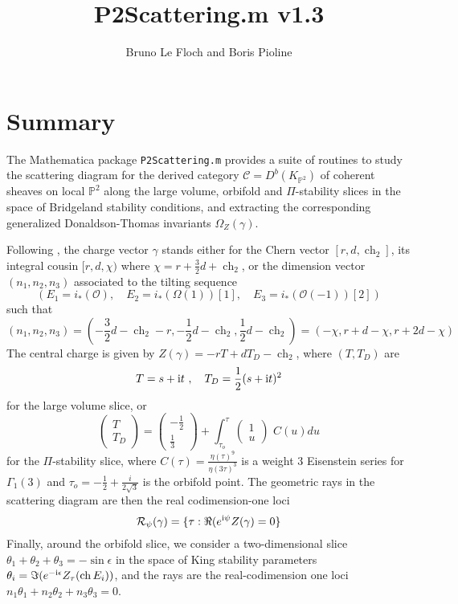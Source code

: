 \documentclass[12pt]{JHEP3}
\title{P2Scattering.m v1.3}
\author{Bruno Le Floch and Boris Pioline}
\newcommand{\cC}{\mathcal{C}}
\newcommand{\cO}{\mathcal{O}}
\newcommand{\IP}{\mathbb{P}}
\newcommand{\be}{\begin{equation}}
\newcommand{\ee}{\end{equation}}
\newcommand{\cR}{\mathcal{R}}
\newcommand{\I}{{\rm i}}
\DeclareMathOperator{\ch}{ch}
\begin{document}
\maketitle

\baselineskip 15pt

\tableofcontents

\medskip

\section{Summary}

The  {\sc Mathematica} package {\tt P2Scattering.m} provides a suite of routines to study
the scattering diagram for the derived category $\cC=D^b(K_{\IP^2})$ of coherent sheaves on 
local $\IP^2$ along the large volume, orbifold and  $\Pi$-stability slices in the space of Bridgeland stability conditions, and extracting the corresponding generalized Donaldson-Thomas invariants $\Omega_Z(\gamma)$. 

Following \cite{P2Global}, the charge vector $\gamma$ stands either for 
the Chern vector $[r,d,\ch_2]$, its integral cousin $[r,d,\chi)$ where $\chi=r+\frac32d+\ch_2$,
or the dimension vector $(n_1,n_2,n_3)$ associated to the tilting sequence 
\be
(E_1=i_*(\cO), \quad E_2=i_*(\Omega(1))[1], \quad E_3 = i_*(\cO(-1))[2])
\ee
such that
\be
(n_1,n_2,n_3) = (-\frac32 d-\ch_2-r,  -\frac12 d-\ch_2, \frac12 d-\ch_2) = (-\chi, r+d-\chi,r+2d-\chi)
\ee
The central charge is given by $Z(\gamma)=-r T + d T_D -\ch_2$, where $(T,T_D)$ are 
\be
T= s+\I t\ ,\quad T_D = \frac12 (s+\I t)^2 
\ee 
for the large volume slice, or 
\be
\label{Eichler0}
 \begin{pmatrix} T \\ T_D  \end{pmatrix}
= \begin{pmatrix} -\frac12 \\ \frac13  \end{pmatrix} 
+  \int_{\tau_o}^{\tau} \begin{pmatrix} 1 \\u \end{pmatrix} \, 
\, C(u)  du
\ee
for the $\Pi$-stability slice, where $C (\tau) = \frac{\eta(\tau)^9}{\eta(3\tau)^3}$ is a
weight 3 Eisenstein series for $\Gamma_1(3)$ and $\tau_o=-\frac12+\frac{i}{2\sqrt3}$ is 
the orbifold point. The geometric rays in the scattering diagram are then the real codimension-one 
loci 
\be
\cR_\psi(\gamma) = \{ \tau : \Re(e^{\I\psi} Z(\gamma)=0 \}
\ee
Finally, around the orbifold slice, we 
consider a two-dimensional slice $\theta_1+\theta_2+\theta_3=-\sin\epsilon$ in the
space of King stability parameters $\theta_i=\Im(e^{-\I\epsilon} Z_\tau(\ch E_i))$, and the rays are
the real-codimension one loci $n_1\theta_1+n_2\theta_2+n_3\theta_3=0$. 
\end{document}
